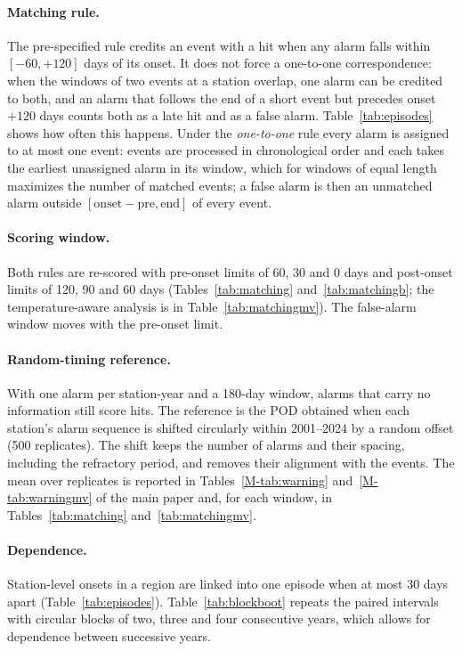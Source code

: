 \documentclass[pdflatex,sn-mathphys-ay]{sn-jnl}
\begin{document}
\paragraph{Matching rule.} The pre-specified rule credits an event with a hit when any alarm falls within
$[-60,+120]$ days of its onset. It does not force a one-to-one correspondence: when the windows of two
events at a station overlap, one alarm can be credited to both, and an alarm that follows the end of a
short event but precedes onset $+120$ days counts both as a late hit and as a false alarm.
Table~\ref{tab:episodes} shows how often this happens. Under the \emph{one-to-one} rule every alarm is
assigned to at most one event: events are processed in chronological order and each takes the earliest
unassigned alarm in its window, which for windows of equal length maximizes the number of matched events;
a false alarm is then an unmatched alarm outside $[\text{onset}-\text{pre},\text{end}]$ of every event.

\paragraph{Scoring window.} Both rules are re-scored with pre-onset limits of 60, 30 and 0 days and
post-onset limits of 120, 90 and 60 days (Tables~\ref{tab:matching} and~\ref{tab:matchingb}; the
temperature-aware analysis is in Table~\ref{tab:matchingmv}). The false-alarm window moves with the
pre-onset limit.

\paragraph{Random-timing reference.} With one alarm per station-year and a 180-day window, alarms that carry
no information still score hits. The reference is the POD obtained when each station's alarm sequence is
shifted circularly within 2001--2024 by a random offset (500 replicates). The shift keeps the number of
alarms and their spacing, including the refractory period, and removes their alignment with the events.
The mean over replicates is reported in Tables~\ref{M-tab:warning} and~\ref{M-tab:warningmv} of the main
paper and, for each window, in Tables~\ref{tab:matching} and~\ref{tab:matchingmv}.

\paragraph{Dependence.} Station-level onsets in a region are linked into one episode when at most 30 days
apart (Table~\ref{tab:episodes}). Table~\ref{tab:blockboot} repeats the paired intervals with circular
blocks of two, three and four consecutive years, which allows for dependence between successive years.
\end{document}
